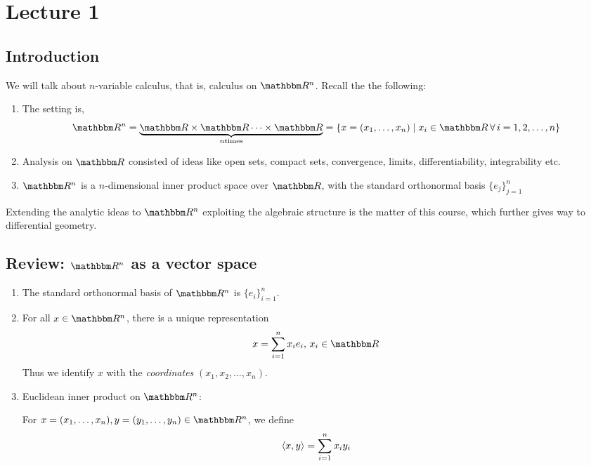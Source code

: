 \documentclass[Analysis-3]{subfiles}
\begin{document}
\chapter*{Lecture 1} %
\setcounter{chapter}{1} %
\setcounter{section}{0}

\section{Introduction}
We will talk about $ n $-variable calculus, that is, calculus on $ \R^n $. Recall the the following:
\begin{enumerate}[label = $\bullet$]
      \item The setting is,
            \[ \R^n = \underbrace{\R \times \R \cdots \times \R}_{n \text{times}} = \{x = (x_1, \dots, x_n) \mid x_i \in \R \, \forall \, i = 1,2, \dots, n\} \]
      \item Analysis on $ \R $ consisted of ideas like open sets, compact sets, convergence, limits, differentiability, integrability etc.
      \item $ \R^n $ is a $ n $-dimensional inner product space over $ \R $, with the standard orthonormal basis $ \{e_j\}_{j=1}^n $
\end{enumerate}

Extending the analytic ideas to $ \R^n $ exploiting the algebraic structure is the matter of this course, which further gives way to differential geometry.

\section{Review: $ \R^n $ as a vector space}

\begin{enumerate}[label = (\roman*)]
      \item The standard orthonormal basis of $ \R^n $ is $ \{e_i\}_{i=1}^n $.
      \item For all $ x \in \R^n $, there is a unique representation
            \[ x = \sum_{i=1}^n x_i e_i, \, x_i \in \R \]
            Thus we identify $ x $ with the \textit{coordinates} $ (x_1,x_2, \dots, x_n) $.
      \item Euclidean inner product on $ \R^n $:

            For $ x = (x_1, \dots, x_n), y = (y_1, \dots, y_n) \in \R^n $, we define
            \[ \left\langle {x}, {y} \right\rangle = \sum_{i=1}^{n} x_iy_i \]
\end{enumerate}
\end{document}
